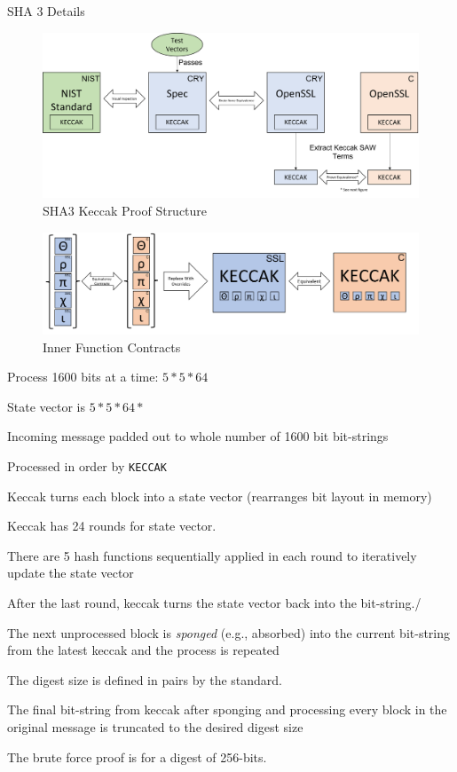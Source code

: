 SHA 3 Details
\begin{figure}[ht]
  \centering
  \includegraphics[width=\linewidth]{figs/proof.png}
  
  \caption{SHA3 Keccak Proof Structure}
  \label{fig:proofStructure}
  
\end{figure}
\begin{figure}[ht]
  \centering
  \includegraphics[width=\linewidth]{figs/proof2.png}
  
  \caption{Inner Function Contracts}
  \label{fig:proofStructure2}
  
\end{figure}

\begin{compactitem}
  \item Process 1600 bits at a time: $5 * 5 * 64$
  \item State vector is $5*5*64*$
  \item Incoming message padded out to whole number of 1600 bit bit-strings
  \item Processed in order by \texttt{KECCAK}
  \item Keccak turns each block into a state vector (rearranges bit layout in memory)
  \item Keccak has 24 rounds for state vector. 
  \item There are 5 hash functions sequentially applied in each round to iteratively update the state vector
  \item After the last round, keccak turns the state vector back into the bit-string./\item The next unprocessed block is \emph{sponged} (e.g., absorbed) into the current bit-string from the latest keccak and the process is repeated 
  \item The digest size is defined in pairs by the standard.
  \item The final bit-string from keccak after sponging and processing every block in the original message is truncated to the desired digest size
  \item The brute force proof is for a digest of 256-bits.
\end{compactitem}

